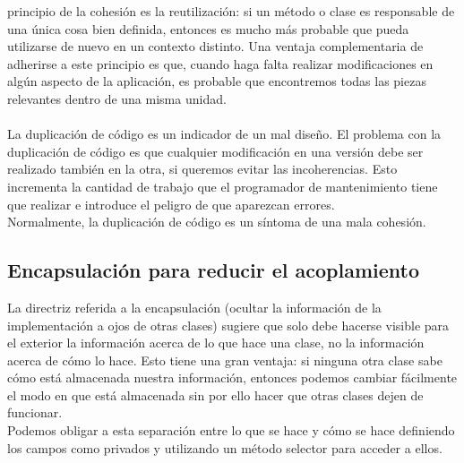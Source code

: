 \documentclass[11pt,a4paper]{article}
\begin{document}
principio de la cohesión es la reutilización: si un método o clase es responsable de una única cosa
bien definida, entonces es mucho más probable que pueda utilizarse de nuevo en un contexto distinto.
Una ventaja complementaria de adherirse a este principio es que, cuando haga falta realizar
modificaciones en algún aspecto de la aplicación, es probable que encontremos todas las piezas
relevantes dentro de una misma unidad.\\
\\
La duplicación de código es un indicador de un mal diseño. El problema con la duplicación de código es
que cualquier modificación en una versión debe ser realizado también en la otra, si queremos evitar
las incoherencias. Esto incrementa la cantidad de trabajo que el programador de mantenimiento
tiene que realizar e introduce el peligro de que aparezcan errores.\\
Normalmente, la duplicación de código es un síntoma de una mala cohesión.
\subsection{Encapsulación para reducir el acoplamiento}
La directriz referida a la encapsulación (ocultar la información de la implementación a ojos de
otras clases) sugiere que solo debe hacerse visible para el exterior la información acerca de lo que
hace una clase, no la información acerca de cómo lo hace. Esto tiene una gran ventaja: si ninguna
otra clase sabe cómo está almacenada nuestra información, entonces podemos cambiar fácilmente
el modo en que está almacenada sin por ello hacer que otras clases dejen de funcionar.\\
Podemos obligar a esta separación entre lo que se hace y cómo se hace definiendo los campos
como privados y utilizando un método selector para acceder a ellos.
\end{document}
